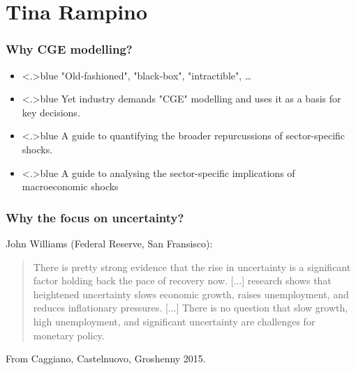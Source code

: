 \documentclass[handout,english]{beamer}
\begin{document}
\section{Tina Rampino}
\begin{frame}
  \frametitle{Why CGE modelling?}

  \begin{itemize}
    \item<+-|alert@+>{\color<.>{blue}
      "Old-fashioned", "black-box", "intractible", \dots
    }
    \item<+-|alert@+>{\color<.>{blue}
      Yet industry demands "CGE" modelling and uses it as a basis for key 
      decisions.
    }
    \item<+-|alert@+>{\color<.>{blue}
      A guide to quantifying the broader repurcussions of sector-specific
      shocks.
    }
    \item<+-|alert@+>{\color<.>{blue}
      A guide to analysing the sector-specific implications of macroeconomic shocks
    }
  \end{itemize}
\vfill
\end{frame}
\begin{frame}
\frametitle{Why the focus on uncertainty?}
John Williams (Federal Reserve, San Fransisco):

\begin{quote}
There is pretty strong evidence that the rise in uncertainty is a significant factor holding back the pace of recovery now. [...] research shows that heightened uncertainty slows economic growth, raises unemployment, and reduces inflationary pressures. [...] There is no question that slow growth, high unemployment, and significant uncertainty are challenges for monetary policy.
\end{quote}
From Caggiano, Castelnuovo, Groshenny 2015.
\end{frame}
\end{document}
